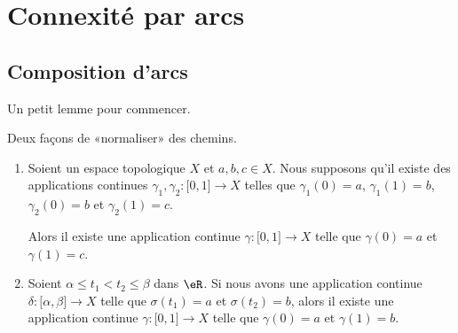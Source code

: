 
\section{Connexité par arcs}

\subsection{Composition d'arcs}

Un petit lemme pour commencer.

\begin{lemma}	\label{LEMooMMTBooYExLZH}
	Deux façons de «normaliser» des chemins.
	\begin{enumerate}
		\item		\label{ITEMooEKYEooMDHSHH}
		      Soient un espace topologique \( X\) et \( a,b,c\in X\). Nous supposons qu'il existe des applications continues \(\gamma_1,\gamma_2 \colon \mathopen[ 0,1\mathclose]\to X  \) telles que \( \gamma_1(0)=a\), \( \gamma_1(1)=b\), \( \gamma_2(0)=b\) et \( \gamma_2(1)=c\).

		      Alors il existe une application continue \(\gamma \colon \mathopen[ 0,1\mathclose]\to X  \) telle que \( \gamma(0)=a\) et \( \gamma(1)=c\).
		\item		\label{ITEMooSBTKooKOtFfw}
		      Soient \( \alpha\leq t_1<t_2\leq \beta\) dans \( \eR\). Si nous avons une application continue \(\delta \colon \mathopen[ \alpha,\beta\mathclose]\to X  \) telle que \( \sigma(t_1)=a\) et \( \sigma(t_2)=b\), alors il existe une application continue \(\gamma \colon \mathopen[ 0,1\mathclose]\to X  \) telle que \( \gamma(0)=a\) et \( \gamma(1)=b\).
	\end{enumerate}
\end{lemma}


